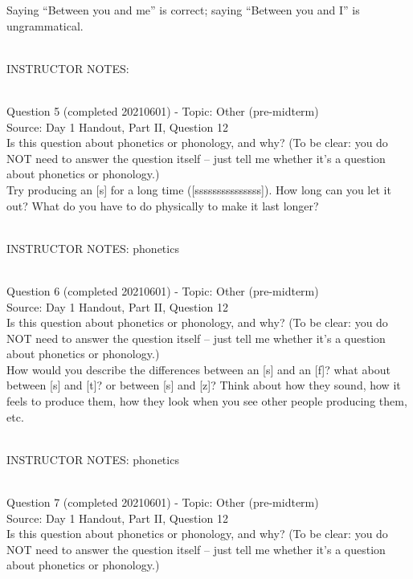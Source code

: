 \documentclass[12pt]{article}
\begin{document}
Saying ``Between you and me'' is correct; saying ``Between you and I'' is ungrammatical.


~\\
INSTRUCTOR NOTES: 


~\\

{\large Question 5} (completed 20210601) - Topic: Other (pre-midterm)\\
Source: Day 1 Handout, Part II, Question 12\\

Is this question about phonetics or phonology, and why? (To be clear: you do NOT need to answer the question itself -- just tell me whether it's a question about phonetics or phonology.)\\

Try producing an {[s]} for a long time ({[sssssssssssssss]}). How long can you let it out? What do you have to do physically to make it last longer?


~\\
INSTRUCTOR NOTES: phonetics


~\\

{\large Question 6} (completed 20210601) - Topic: Other (pre-midterm)\\
Source: Day 1 Handout, Part II, Question 12\\

Is this question about phonetics or phonology, and why? (To be clear: you do NOT need to answer the question itself -- just tell me whether it's a question about phonetics or phonology.)\\

How would you describe the differences between an {[s]} and an {[f]}? what about between {[s]} and {[t]}? or between {[s]} and {[z]}? Think about how they sound, how it feels to produce them, how they look when you see other people producing them, etc.


~\\
INSTRUCTOR NOTES: phonetics


~\\

{\large Question 7} (completed 20210601) - Topic: Other (pre-midterm)\\
Source: Day 1 Handout, Part II, Question 12\\

Is this question about phonetics or phonology, and why? (To be clear: you do NOT need to answer the question itself -- just tell me whether it's a question about phonetics or phonology.)\\
\end{document}
